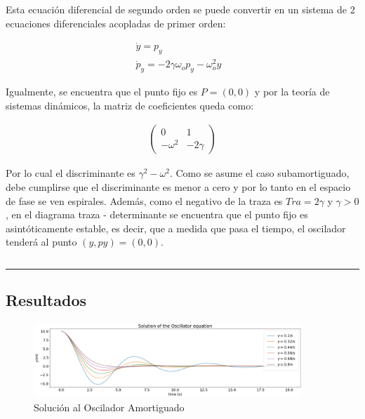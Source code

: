 \documentclass[a4paper]{article}
\theoremstyle{definition}
\theoremstyle{plain}
\begin{document}
Esta ecuación diferencial de segundo orden se puede convertir en un sistema de 2 ecuaciones diferenciales acopladas de primer orden:

\begin{align*}
 \dot y  = p_y & \\
 \dot p_y = - 2\gamma \omega_o p_y - \omega_o^2  y 
\end{align*}

Igualmente, se encuentra que el punto fijo es $P =(0, 0)$ y por la teoría de sistemas dinámicos, la matriz de coeficientes queda como:

\begin{align*}
    \begin{pmatrix}
        0 & 1\\
        -\omega^2 & -2\gamma
    \end{pmatrix}
\end{align*}

Por lo cual el discriminante es $\gamma^2 - \omega^2 $. Como se asume el caso subamortiguado, debe cumplirse que el discriminante es menor a cero y por lo tanto en el espacio de fase se ven espirales. Además, como el negativo  de la traza es $Tra=2\gamma$ y $\gamma > 0$, en el diagrama traza - determinante se encuentra que el punto fijo es asintóticamente estable, es decir, que a medida que pasa el tiempo, el oscilador tenderá al punto $(y, py) = (0,0)$. 

\begin{equation*}
    
\end{equation*}

\rule{145 mm}{0.1 mm}

\subsection{Resultados}

\begin{figure}[H]
\begin {center}
\includegraphics[width=0.9\textwidth]{output_2_0.png}
\caption{Solución al Oscilador Amortiguado}
\label{fig:solutionA}
\end {center}
\end{figure}
\end{document}
